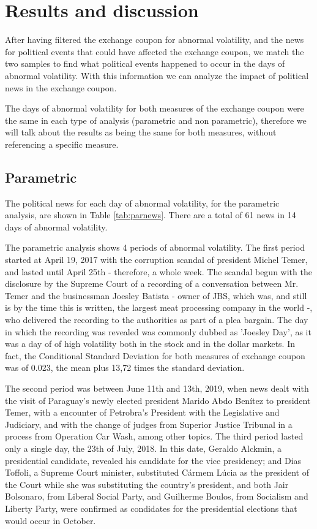 \documentclass[a4paper]{article}
\begin{document}
\section{Results and discussion}

After having filtered the exchange coupon for abnormal volatility, and the news for political events that could have affected the exchange coupon, we match the two samples to find what political events happened to occur in the days of abnormal volatility. With this information we can analyze the impact of political news in the exchange coupon.

The days of abnormal volatility for both measures of the exchange coupon were the same in each type of analysis (parametric and non parametric), therefore we will talk about the results as being the same for both measures, without referencing a specific measure.

\subsection{Parametric}

The political news for each day of abnormal volatility, for the parametric analysis, are shown in Table \ref{tab:parnews}. There are a total of 61 news in 14 days of abnormal volatility.



The parametric analysis shows 4 periods of abnormal volatility. The first period started at April 19, 2017 with the corruption scandal of president Michel Temer, and lasted until April 25th - therefore, a whole week. The scandal begun with the disclosure by the Supreme Court of a recording of a conversation between Mr. Temer and the businessman Joesley Batista - owner of JBS, which was, and still is by the time this is written, the largest meat processing company in the world -, who delivered the recording to the authorities as part of a plea bargain. The day in which the recording was revealed was commonly dubbed as 'Joesley Day', as it was a day of of high volatility both in the stock and in the dollar markets. In fact, the Conditional Standard Deviation for both measures of exchange coupon was of 0.023, the mean plus 13,72 times the standard deviation.

The second period was between June 11th and 13th, 2019, when news dealt with the visit of Paraguay's newly elected president Marido Abdo Benítez to president Temer, with a encounter of Petrobra's President with the Legislative and Judiciary, and with the change of judges from Superior Justice Tribunal in a process from Operation Car Wash, among other topics. The third period lasted only a single day, the 23th of July, 2018. In this date, Geraldo Alckmin, a presidential candidate, revealed his candidate for the vice presidency; and Dias Toffoli, a Supreme Court minister, substituted Cármem Lúcia as the president of the Court while she was substituting the country's president, and both Jair Bolsonaro, from Liberal Social Party, and Guilherme Boulos, from Socialism and Liberty Party, were confirmed as condidates for the presidential elections that would occur in October.
\end{document}
